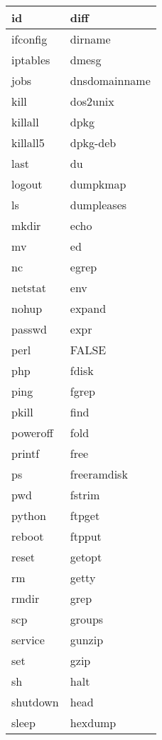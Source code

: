 \begin{longtable}{p{100mm}p{100mm}}
     \hline
     id & diff \\
     \hline
     ifconfig & dirname \\
     \hline
     iptables & dmesg \\
     \hline
     jobs & dnsdomainname \\
     \hline
     kill & dos2unix \\
     \hline
     killall & dpkg \\
     \hline
     killall5 & dpkg-deb \\
     \hline
     last & du \\
     \hline
     logout & dumpkmap \\
     \hline
     ls & dumpleases \\
     \hline
     mkdir & echo \\
     \hline
     mv & ed \\
     \hline
     nc & egrep \\
     \hline
     netstat & env \\
     \hline
     nohup & expand \\
     \hline
     passwd & expr \\
     \hline
     perl & FALSE \\
     \hline
     php & fdisk \\
     \hline
     ping & fgrep \\
     \hline
     pkill & find \\
     \hline
     poweroff & fold \\
     \hline
     printf & free \\
     \hline
     ps & freeramdisk \\
     \hline
     pwd & fstrim \\
     \hline
     python & ftpget \\
     \hline
     reboot & ftpput \\
     \hline
     reset & getopt \\
     \hline
     rm & getty \\
     \hline
     rmdir & grep \\
     \hline
     scp & groups \\
     \hline
     service & gunzip \\
     \hline
     set & gzip \\
     \hline
     sh & halt \\
     \hline
     shutdown & head \\
     \hline
     sleep & hexdump \\

\end{longtable}
